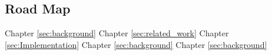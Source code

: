 \subsection{Road Map}

Chapter \ref{sec:background}
Chapter \ref{sec:related_work}
Chapter \ref{sec:Implementation}
Chapter \ref{sec:background}
Chapter \ref{sec:background}